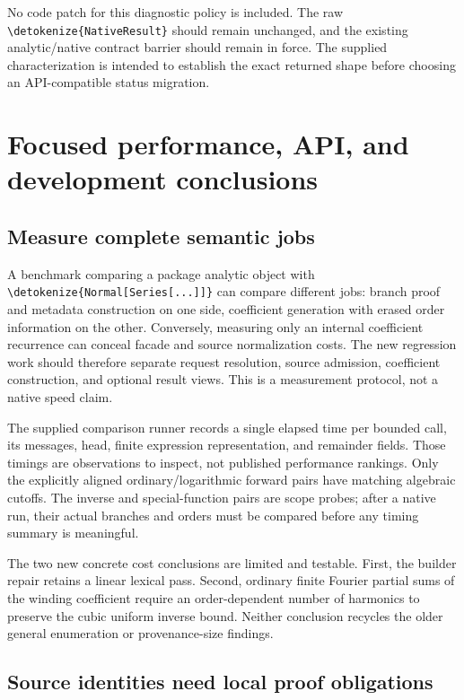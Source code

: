 \documentclass[11pt,a4paper]{article}
\newcommand{\wl}[1]{\texttt{\expandafter\nolinkurl\expandafter{\detokenize{#1}}}}
\begin{document}
No code patch for this diagnostic policy is included. The raw \wl{NativeResult}
should remain unchanged, and the existing analytic/native contract barrier
should remain in force. The supplied characterization is intended to establish
the exact returned shape before choosing an API-compatible status migration.

\section{Focused performance, API, and development conclusions}

\subsection{Measure complete semantic jobs}

A benchmark comparing a package analytic object with \wl{Normal[Series[...]]}
can compare different jobs: branch proof and metadata construction on one side,
coefficient generation with erased order information on the other. Conversely,
measuring only an internal coefficient recurrence can conceal facade and source
normalization costs. The new regression work should therefore separate request
resolution, source admission, coefficient construction, and optional result
views. This is a measurement protocol, not a native speed claim.\cite{core,native}

The supplied comparison runner records a single elapsed time per bounded call,
its messages, head, finite expression representation, and remainder fields.
Those timings are observations to inspect, not published performance rankings.
Only the explicitly aligned ordinary/logarithmic forward pairs have matching
algebraic cutoffs. The inverse and special-function pairs are scope probes;
after a native run, their actual branches and orders must be compared before
any timing summary is meaningful.

The two new concrete cost conclusions are limited and testable. First, the
builder repair retains a linear lexical pass. Second, ordinary finite Fourier
partial sums of the winding coefficient require an order-dependent number of
harmonics to preserve the cubic uniform inverse bound. Neither conclusion
recycles the older general enumeration or provenance-size findings.

\subsection{Source identities need local proof obligations}
\end{document}
